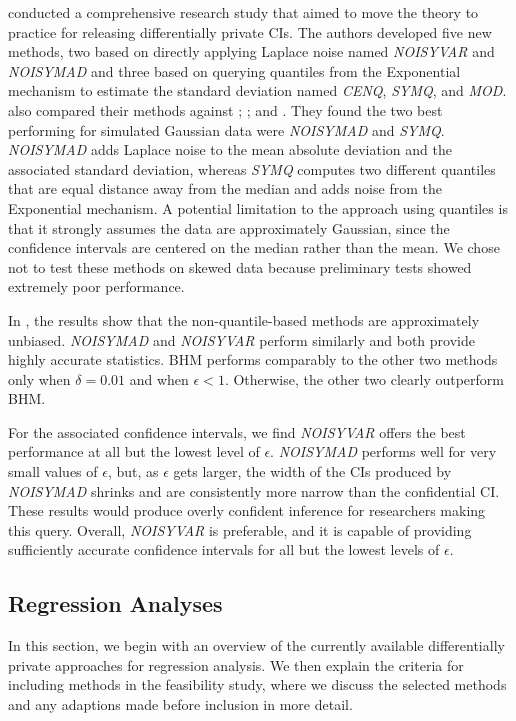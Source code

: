\citet{du2020differentially} conducted a comprehensive research study that aimed to move the theory to practice for releasing differentially private CIs. The authors developed five new methods, two based on directly applying Laplace noise named \textit{NOISYVAR} and \textit{NOISYMAD} and three based on querying quantiles from the Exponential mechanism  to estimate the standard deviation named \textit{CENQ}, \textit{SYMQ}, and \textit{MOD}. \citet{du2020differentially} also compared their methods against \citet{karwa2017finite}; \citet{d2015differential}; and \citet{brawner2018bootstrap}. They found the two best performing for simulated Gaussian data were \textit{NOISYMAD} and \textit{SYMQ}. \textit{NOISYMAD} adds Laplace noise to the mean absolute deviation and the associated standard deviation, whereas \textit{SYMQ} computes two different quantiles that are equal distance away from the median and adds noise from the Exponential mechanism. A potential limitation to the approach using quantiles is that it strongly assumes the data are approximately Gaussian, since the confidence intervals are centered on the median rather than the mean. We chose not to test these methods on skewed data because preliminary tests showed extremely poor performance.

In \citet{barrientos2021}, the results show that the non-quantile-based methods are approximately unbiased. \textit{NOISYMAD} and \textit{NOISYVAR} perform similarly and both provide highly accurate statistics. BHM performs comparably to the other two methods only when $\delta = 0.01$ and when $\epsilon < 1$. Otherwise, the other two clearly outperform BHM.

For the associated confidence intervals, we find \textit{NOISYVAR} offers the best performance at all but the lowest level of $\epsilon$. \textit{NOISYMAD} performs well for very small values of $\epsilon$, but, as $\epsilon$ gets larger, the width of the CIs produced by \textit{NOISYMAD} shrinks and are consistently more narrow than the confidential CI. These results would produce overly confident inference for researchers making this query. Overall, \textit{NOISYVAR} is preferable, and it is capable of providing sufficiently accurate confidence intervals for all but the lowest levels of $\epsilon$.

\subsection{Regression Analyses}
In this section, we begin with an overview of the currently available differentially private approaches for regression analysis. We then explain the criteria for including methods in the feasibility study, where we discuss the selected methods and any adaptions made before inclusion in more detail.

